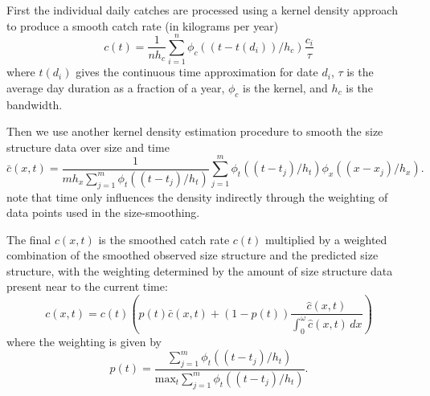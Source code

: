 \documentclass{article}
\begin{document}
First the individual daily catches are processed using a kernel density approach to produce a smooth catch rate (in kilograms per year)
\begin{equation}
  c(t) = \frac{1}{n h_c} \sum_{i=1}^n \phi_c( (t-t(d_i)) / h_c ) \frac{c_i}{\tau}
\end{equation}
where $t(d_i)$ gives the continuous time approximation for date $d_i$, $\tau$ is the average day duration as a fraction of a year, $\phi_c$ is the kernel, and $h_c$ is the bandwidth.
  

Then we use another kernel density estimation procedure to smooth the size structure data over size and time
\begin{equation}
  \bar{c}(x,t) = \frac{1}{m h_x\sum_{j=1}^m \phi_t((t-t_j)/h_t)} \sum_{j=1}^m \phi_t((t-t_j)/h_t) \phi_x((x - x_j)/h_x).
\end{equation}
note that time only influences the density indirectly through the weighting of data points used in the size-smoothing. 

The final $c(x,t)$ is the smoothed catch rate $c(t)$ multiplied by a weighted combination of the smoothed observed size structure and the predicted size structure, with the weighting determined by the amount of size structure data present near to the current time:
\begin{equation}
    c(x,t) = c(t)\left(p(t) \bar{c}(x,t) + (1-p(t)) \frac{\hat{c}(x,t)}{\int_0^\omega \hat{c}(x,t)\,dx}\right)
\end{equation}
where the weighting is given by
\begin{equation}
  p(t) = \frac{\sum_{j=1}^m\phi_t((t-t_j)/h_t)}{\text{max}_t\sum_{j=1}^m\phi_t((t-t_j)/h_t)}.
\end{equation}
\end{document}
